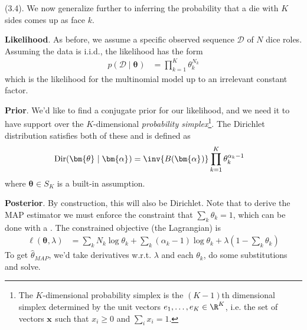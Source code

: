 \documentclass[11pt]{article}
\renewcommand\vec[2][]{\bm{#2}_{#1}}
\newcommand\myspace[1][]{\vspace{#1\bigskipamount}}
\newcommand\p{\Needspace{10\baselineskip} \noindent}
\begin{document}
\myspace
\p {} (3.4). We now generalize further to inferring the probability that a die with $K$ sides comes up as face $k$. 
\begin{compactitem}
	\item \textbf{Likelihood}. As before, we assume a specific observed sequence $\mathcal D$ of $N$ dice roles. Assuming the data is i.i.d., the likelihood has the form
	\begin{align}
		p(\mathcal D \mid \vec\theta) 
			&= \prod_{k=1}^K \theta_k^{N_k}
	\end{align}
	which is the likelihood for the multinomial model up to an irrelevant constant factor.
	
	\item \textbf{Prior}. We'd like to find a conjugate prior for our likelihood, and we need it to have support over the $K$-dimensional \textit{probability simplex}\footnote{The $K$-dimensional probability simplex is the $(K-1)$th dimensional simplex determined by the unit vectors $e_1, \ldots, e_K \in \R^K$, i.e. the set of vectors $\vec x$ such that $x_i \ge 0$ and $\sum_i x_i = 1$.}. The Dirichlet distribution satisfies both of these and is defined as
	\begin{align}
		\text{Dir}(\vec\theta \mid \vec\alpha) 
			&= \inv{B(\vec\alpha)} \prod_{k=1}^K \theta_k^{\alpha_k - 1} 
	\end{align}
	where $\vec\theta \in S_K$ is a built-in assumption.
	
	\item \textbf{Posterior}. By construction, this will also be Dirichlet. Note that to derive the MAP estimator we must enforce the constraint that $\sum_k \theta_k = 1$, which can be done with a . The constrained objective (the Lagrangian) is 
	\begin{align}
		\ell(\vec\theta, \lambda)
			&= \sum_k N_k \log\theta_k + \sum_k (\alpha_k - 1)\log\theta_k 
				+ \lambda \left(   1 - \sum_k \theta_k  \right)
	\end{align}
	To get $\hat{\theta}_{MAP}$, we'd take derivatives w.r.t. $\lambda$ and each $\theta_k$, do some substitutions and solve. 
\end{compactitem}	
\end{document}

